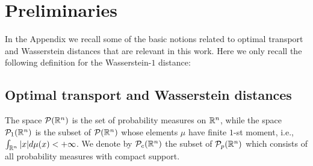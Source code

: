 
\section{Preliminaries}\label{meanfield}

In the Appendix we recall some of the basic notions related to optimal transport and Wasserstein distances that are relevant in this work.
Here we only recall the following definition for the Wasserstein-$1$ distance:

\subsection{Optimal transport and Wasserstein distances}

The space $\mathcal{P}(\mathbb{R}^n)$ is the set of probability measures on $\mathbb{R}^n$, while the space %
$\mathcal{P}_1(\mathbb{R}^n)$ is the subset of $\mathcal{P}(\mathbb{R}^n)$ whose elements $\mu$ have finite $1$-st moment, i.e.,
$\int_{\mathbb{R}^n} |x| d\mu(x) < +\infty$.
We denote by $\mathcal{P}_c(\mathbb{R}^n)$ the subset of $\mathcal{P}_p(\mathbb{R}^n)$ which consists of all probability measures with compact support. %
%
